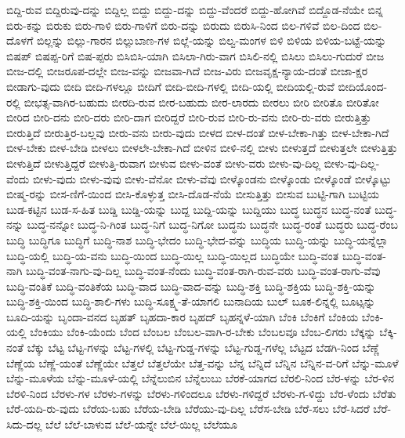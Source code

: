 {ಬಿದ್ದಿ-ರುವ
ಬಿದ್ದಿರುವು-ದನ್ನು
ಬಿದ್ದಿಲ್ಲ
ಬಿದ್ದು
ಬಿದ್ದು-ದನ್ನು
ಬಿದ್ದು-ವೆಂದರೆ
ಬಿದ್ದು-ಹೋಗಿವೆ
ಬಿದ್ದೊಡ-ನೆಯೇ
ಬಿನ್ನ
ಬಿರು-ಕನ್ನು
ಬಿರುಕು
ಬಿರು-ಗಾಳಿ
ಬಿರು-ಗಾಳಿಗೆ
ಬಿರು-ದನ್ನು
ಬಿರುದು
ಬಿರುಸಿ-ನಿಂದ
ಬಿಲ-ಗಳಿವೆ
ಬಿಲ-ದಿಂದ
ಬಿಲ-ದೊಳಗೆ
ಬಿಲ್ಲನ್ನು
ಬಿಲ್ಲು-ಗಾರನ
ಬಿಲ್ಲುಬಾಣ-ಗಳ
ಬಿಲ್ಲೆ-ಯನ್ನು
ಬಿಲ್ವ-ಮಂಗಳ
ಬಿಳಿ
ಬಿಳಿಯ
ಬಿಳಿಯ-ಬಟ್ಟೆ-ಯನ್ನು
ಬಿಷಪ್
ಬಿಷಪ್ಪ-ರಿಗೆ
ಬಿಷ-ಪ್ಪರು
ಬಿಸಿಬಿಸಿ-ಯಾಗಿ
ಬಿಸಿಲಾ-ಗಿರು-ವಾಗ
ಬಿಸಿಲಿ-ನಲ್ಲಿ
ಬಿಸಿಲು
ಬಿಸಿಲು-ಗುದುರೆ
ಬೀಜ
ಬೀಜ-ದಲ್ಲಿ
ಬೀಜರೂಪ-ದಲ್ಲೇ
ಬೀಜ-ವನ್ನು
ಬೀಜವಾ-ಗಿದೆ
ಬೀಜ-ವಿರು
ಬೀಜವೃಕ್ಷ-ನ್ಯಾಯ-ದಂತೆ
ಬೀಜಾ-ಕ್ಷರ
ಬೀಡಾಗು-ವುದು
ಬೀದಿ
ಬೀದಿ-ಗಳಲ್ಲೂ
ಬೀದಿಗೆ
ಬೀದಿ-ಬೀದಿ-ಗಳಲ್ಲಿ
ಬೀದಿ-ಯಲ್ಲಿ
ಬೀದಿಯಲ್ಲಿ-ರುವೆ
ಬೀದಿಯೊಂದ-ರಲ್ಲಿ
ಬೀಭತ್ಸ-ವಾಗಿರ-ಬಹುದು
ಬೀರದಿ-ರುವ
ಬೀರ-ಬಹುದು
ಬೀರ-ಲಾರದು
ಬೀರಲು
ಬೀರಿ
ಬೀರಿತೊ
ಬೀರಿತೋ
ಬೀರಿದ
ಬೀರಿ-ದನು
ಬೀರಿ-ದರು
ಬೀರಿ-ದಾಗ
ಬೀರಿದ್ದರೆ
ಬೀರಿ-ರುವ
ಬೀರಿ-ರು-ವನು
ಬೀರಿ-ರು-ವರು
ಬೀರುತ್ತಿತ್ತು
ಬೀರುತ್ತಿದೆ
ಬೀರುತ್ತಿರ-ಬಲ್ಲವು
ಬೀರು-ವನು
ಬೀರು-ವುದು
ಬೀಳದ
ಬೀಳ-ದಂತೆ
ಬೀಳ-ಬೇಕಾ-ಗಿತ್ತು
ಬೀಳ-ಬೇಕಾ-ಗಿದೆ
ಬೀಳ-ಬೇಕು
ಬೀಳ-ಬೇಡಿ
ಬೀಳಲು
ಬೀಳಲೇ-ಬೇಕಾ-ಗಿದೆ
ಬೀಳಿನ
ಬೀಳಿ-ನಲ್ಲಿ
ಬೀಳು
ಬೀಳುತ್ತದೆ
ಬೀಳುತ್ತಲೇ
ಬೀಳುತ್ತಿತ್ತು
ಬೀಳುತ್ತಿದೆ
ಬೀಳುತ್ತಿದ್ದರೆ
ಬೀಳುತ್ತಿ-ರುವಾಗ
ಬೀಳುವ
ಬೀಳು-ವಂತೆ
ಬೀಳು-ವರು
ಬೀಳು-ವು-ದಿಲ್ಲ
ಬೀಳು-ವು-ದಿಲ್ಲ-ವೆಂದು
ಬೀಳು-ವುದು
ಬೀಳು-ವುವು
ಬೀಳು-ವೆನೋ
ಬೀಳು-ವೆವು
ಬೀಳ್ಕೊಂಡನು
ಬೀಳ್ಕೊಂಡು
ಬೀಳ್ಕೊಂಡೆ
ಬೀಳ್ಕೊಟ್ಟು
ಬೀಷ್ಮ-ರನ್ನು
ಬೀಸ-ಣಿಗೆ-ಯಿಂದ
ಬೀಸಿ-ಕೊಳ್ಳುತ್ತ
ಬೀಸಿ-ದೊಡ-ನೆಯೆ
ಬೀಸುತ್ತಿತ್ತು
ಬೀಸುವ
ಬುಟ್ಟಿ-ಗಾಗಿ
ಬುಟ್ಟಿಯ
ಬುಡ-ಕಟ್ಟಿನ
ಬುಡ-ಸ-ಹಿತ
ಬುಡ್ಡಿ
ಬುಡ್ಡಿ-ಯನ್ನು
ಬುದ್ದ
ಬುದ್ದಿ-ಯನ್ನು
ಬುದ್ದಿಯು
ಬುದ್ಧ
ಬುದ್ಧನ
ಬುದ್ಧ-ನಂತೆ
ಬುದ್ಧ-ನನ್ನು
ಬುದ್ಧ-ನನ್ನೋ
ಬುದ್ಧ-ನಿ-ಗಿಂತ
ಬುದ್ಧ-ನಿಗೆ
ಬುದ್ಧ-ನಿಗೋ
ಬುದ್ಧನು
ಬುದ್ಧನೇ
ಬುದ್ಧ-ರಂತೆ
ಬುದ್ಧರು
ಬುದ್ಧ-ರೆಂಬ
ಬುದ್ಧಿ
ಬುದ್ಧಿಗೂ
ಬುದ್ಧಿಗೆ
ಬುದ್ಧಿ-ನಾಶ
ಬುದ್ಧಿ-ಭೇದಂ
ಬುದ್ಧಿ-ಭೇದ-ವನ್ನು
ಬುದ್ಧಿಯ
ಬುದ್ಧಿ-ಯನ್ನು
ಬುದ್ಧಿ-ಯನ್ನೆಲ್ಲಾ
ಬುದ್ಧಿ-ಯಲ್ಲಿ
ಬುದ್ಧಿ-ಯ-ವನು
ಬುದ್ಧಿ-ಯಿಂದ
ಬುದ್ಧಿ-ಯಿಲ್ಲ
ಬುದ್ಧಿ-ಯಿಲ್ಲದ
ಬುದ್ಧಿಯೇ
ಬುದ್ಧಿ-ವಂತ
ಬುದ್ಧಿ-ವಂತ-ನಾಗಿ
ಬುದ್ಧಿ-ವಂತ-ನಾಗು-ವು-ದಿಲ್ಲ
ಬುದ್ಧಿ-ವಂತ-ನೆಂದು
ಬುದ್ಧಿ-ವಂತ-ರಾಗಿ-ರುವ-ವರು
ಬುದ್ಧಿ-ವಂತ-ರಾಗು-ವೆವು
ಬುದ್ಧಿ-ವಂತಿಕೆ
ಬುದ್ಧಿ-ವಂತಿಕೆಯ
ಬುದ್ಧಿ-ವಾದ
ಬುದ್ಧಿ-ವಾದ-ವನ್ನು
ಬುದ್ಧಿ-ಶಕ್ತಿ
ಬುದ್ಧಿ-ಶಕ್ತಿಯ
ಬುದ್ಧಿ-ಶಕ್ತಿ-ಯನ್ನು
ಬುದ್ಧಿ-ಶಕ್ತಿ-ಯಿಂದ
ಬುದ್ಧಿ-ಶಾಲಿ-ಗಳು
ಬುದ್ಧಿ-ಸೂಕ್ಷ್ಮ-ತೆ-ಯಾಗಲಿ
ಬುನಾದಿಯ
ಬುಲ್
ಬೂಕ-ಲಿನ್ನಲ್ಲಿ
ಬೂಟ್ಸನ್ನು
ಬೂದಿ-ಯನ್ನು
ಬೃಂದಾ-ವನದ
ಬೃಹತ್
ಬೃಹದಾ-ಕಾರ
ಬೃಹದ್
ಬೃಹನ್ನಳೆ-ಯಾಗಿ
ಬೆಂಕಿ
ಬೆಂಕಿಗೆ
ಬೆಂಕಿಯ
ಬೆಂಕಿ-ಯಲ್ಲಿ
ಬೆಂಕಿಯು
ಬೆಂಕಿ-ಯೆಂದು
ಬೆಂದ
ಬೆಂಬಲ
ಬೆಂಬಲ-ವಾಗಿ-ರ-ಬೇಕು
ಬೆಂಬಲವೂ
ಬೆಂಬ-ಲಿಗರು
ಬೆಕ್ಕನ್ನು
ಬೆಕ್ಕಿ-ನಂತೆ
ಬೆಕ್ಕು
ಬೆಟ್ಟ
ಬೆಟ್ಟ-ಗಳನ್ನು
ಬೆಟ್ಟ-ಗಳಲ್ಲಿ
ಬೆಟ್ಟ-ಗುಡ್ಡ-ಗಳನ್ನು
ಬೆಟ್ಟ-ಗುಡ್ಡ-ಗಳೆಲ್ಲ
ಬೆಟ್ಟದ
ಬೆಡಗಿ-ನಿಂದ
ಬೆಣ್ಣೆ
ಬೆಣ್ಣೆಯ
ಬೆಣ್ಣೆ-ಯಂತೆ
ಬೆಣ್ಣೆಯೇ
ಬೆತ್ತಲೆ
ಬೆತ್ತಲೆಯೇ
ಬೆತ್ತ-ವನ್ನು
ಬೆನ್ನ
ಬೆನ್ನಿದೆ
ಬೆನ್ನಿನ
ಬೆನ್ನಿನ-ವ-ರಿಗೆ
ಬೆನ್ನು-ಮೂಳೆ
ಬೆನ್ನು-ಮೂಳೆಯ
ಬೆನ್ನು-ಮೂಳೆ-ಯಲ್ಲಿ
ಬೆನ್ನೆಲುಬಿನ
ಬೆನ್ನೆಲುಬು
ಬೆರಕೆ-ಯಾಗದ
ಬೆರಲಿ-ನಿಂದ
ಬೆರ-ಳನ್ನು
ಬೆರ-ಳಿನ
ಬೆರಳಿ-ನಿಂದ
ಬೆರಳು-ಗಳ
ಬೆರಳು-ಗಳನ್ನು
ಬೆರಳು-ಗಳಿಂದಲೂ
ಬೆರಳು-ಗಳಿದ್ದರೆ
ಬೆರಳು-ಗ-ಳಿದ್ದು
ಬೆರ-ಳೆಂದು
ಬೆರೆತು
ಬೆರೆ-ಯದಿ-ರು-ವುದು
ಬೆರೆಯ-ಬಹು
ಬೆರೆಯ-ಬೇಡಿ
ಬೆರೆಯು-ವು-ದಿಲ್ಲ
ಬೆರೆಸ-ಬೇಡಿ
ಬೆರೆ-ಸಲು
ಬೆರೆ-ಸಿದರೆ
ಬೆರೆ-ಸಿದು-ದಲ್ಲ
ಬೆಲೆ
ಬೆಲೆ-ಬಾಳುವ
ಬೆಲೆ-ಯನ್ನೇ
ಬೆಲೆ-ಯಿಲ್ಲ
ಬೆಲೆಯೂ
}
